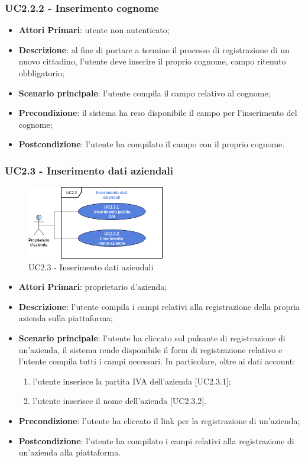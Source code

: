 \subsubsection{UC2.2.2 - Inserimento cognome}
\begin{itemize}
	\item \textbf{Attori Primari}: utente non autenticato;
	\item \textbf{Descrizione}: al fine di portare a termine il processo di registrazione di un nuovo cittadino, l'utente deve inserire il proprio cognome, campo ritenuto obbligatorio;
	\item \textbf{Scenario principale}: l'utente compila il campo relativo al cognome;
	\item \textbf{Precondizione}: il sistema ha reso disponibile il campo per l'inserimento del cognome;
	\item \textbf{Postcondizione}: l'utente ha compilato il campo con il proprio cognome.
\end{itemize}

\subsubsection{UC2.3 - Inserimento dati aziendali}
\begin{figure}[h]
	\includegraphics[width=6cm]{res/images/UC2-3RegistrazioneGenerale.png}
	\centering
	\caption{UC2.3 - Inserimento dati aziendali}
\end{figure}
\begin{itemize}
	\item \textbf{Attori Primari}: proprietario d'azienda;
	\item \textbf{Descrizione}: l'utente compila i campi relativi alla registrazione della propria azienda sulla piattaforma;
	\item \textbf{Scenario principale}: l'utente ha cliccato sul pulsante di registrazione di un'azienda, il sistema rende disponibile il form di registrazione relativo e l'utente compila tutti i campi necessari. In particolare, oltre ai dati account:
	\begin{enumerate}[label=\alph*.]
		\item l'utente inserisce la partita IVA dell'azienda [UC2.3.1];
		\item l'utente inserisce il nome dell'azienda [UC2.3.2].
	\end{enumerate}
	\item \textbf{Precondizione}: l'utente ha cliccato il link per la registrazione di un'azienda;
	\item \textbf{Postcondizione}: l'utente ha compilato i campi relativi alla registrazione di un'azienda alla piattaforma.
\end{itemize}
